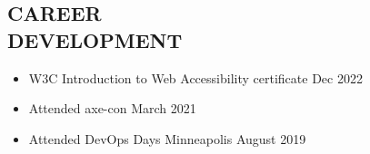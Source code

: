 \documentclass[margin]{res}
\begin{document}
\begin{resume}
\section{CAREER \\ DEVELOPMENT}
    \begin{itemize} \itemsep -2pt
        \item W3C Introduction to Web Accessibility certificate \hfill Dec 2022
        \item Attended axe-con \hfill March 2021
        \item Attended DevOps Days Minneapolis \hfill August 2019
    \end{itemize}

\end{resume}
\end{document}
